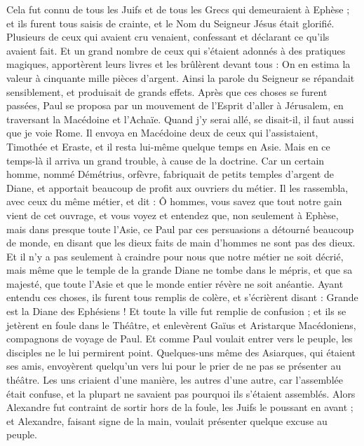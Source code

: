\begin{multicols}{2}
Cela fut connu de tous les Juifs et de tous les Grecs qui demeuraient à Ephèse ; et ils furent tous saisis de crainte, et le Nom du Seigneur Jésus était glorifié.
Plusieurs de ceux qui avaient cru venaient, confessant et déclarant ce qu'ils avaient fait.
Et un grand nombre de ceux qui s’étaient adonnés à des pratiques magiques, apportèrent leurs livres et les brûlèrent devant tous : On en estima la valeur à cinquante mille pièces d'argent.
Ainsi la parole du Seigneur se répandait sensiblement, et produisait de grands effets.
Après que ces choses se furent passées, Paul se proposa par un mouvement de l'Esprit d'aller à Jérusalem, en traversant la Macédoine et l’Achaïe. Quand j’y serai allé, se disait-il, il faut aussi que je voie Rome.
Il envoya en Macédoine deux de ceux qui l'assistaient, Timothée et Eraste, et il resta lui-même quelque temps en Asie.
Mais en ce temps-là il arriva un grand trouble, à cause de la doctrine.
Car un certain homme, nommé Démétrius, orfèvre, fabriquait de petits temples d'argent de Diane, et apportait beaucoup de profit aux ouvriers du métier.
Il les rassembla, avec ceux du même métier, et dit : Ô hommes, vous savez que tout notre gain vient de cet ouvrage,
et vous voyez et entendez que, non seulement à Ephèse, mais dans presque toute l'Asie, ce Paul par ces persuasions a détourné beaucoup de monde, en disant que les dieux faits de main d’hommes ne sont pas des dieux.
Et il n'y a pas seulement à craindre pour nous que notre métier ne soit décrié, mais même que le temple de la grande Diane ne tombe dans le mépris, et que sa majesté, que toute l'Asie et que le monde entier révère ne soit anéantie.
Ayant entendu ces choses, ils furent tous remplis de colère, et s'écrièrent disant : Grande est la Diane des Ephésiens !
Et toute la ville fut remplie de confusion ; et ils se jetèrent en foule dans le Théâtre, et enlevèrent Gaïus et Aristarque Macédoniens, compagnons de voyage de Paul.
Et comme Paul voulait entrer vers le peuple, les disciples ne le lui permirent point.
Quelques-uns même des Asiarques, qui étaient ses amis, envoyèrent quelqu’un vers lui pour le prier de ne pas se présenter au théâtre.
Les uns criaient d'une manière, les autres d'une autre, car l'assemblée était confuse, et la plupart ne savaient pas pourquoi ils s’étaient assemblés.
Alors Alexandre fut contraint de sortir hors de la foule, les Juifs le poussant en avant ; et Alexandre, faisant signe de la main, voulait présenter quelque excuse au peuple.

\end{multicols}
